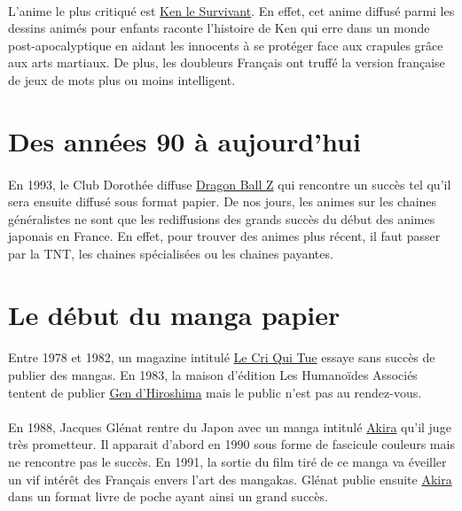 \paragraph{} L'anime le plus critiqué est \underline{Ken le Survivant}. En
effet, cet anime diffusé parmi les dessins animés pour enfants raconte
l'histoire de Ken qui erre dans un monde post-apocalyptique en aidant les
innocents à se protéger face aux crapules grâce aux arts martiaux. De plus, les
doubleurs Français ont truffé la version française de jeux de mots plus ou
moins intelligent.

\section{Des années 90 à aujourd'hui}

\paragraph{} En 1993, le Club Dorothée diffuse \underline{Dragon Ball Z} qui
rencontre un  succès tel qu'il sera ensuite diffusé sous format papier. De nos
jours, les animes sur les chaines généralistes ne sont que les rediffusions des
grands succès du début des animes japonais en France.  En effet, pour trouver
des animes plus récent, il faut passer par la TNT, les chaines spécialisées ou
les chaines payantes.

\section{Le début du manga papier}

\paragraph{} Entre 1978 et 1982, un magazine intitulé \underline{Le Cri Qui
Tue} essaye sans succès de publier des mangas. En 1983, la maison d'édition Les
Humanoïdes Associés tentent de publier \underline{Gen d'Hiroshima} mais le
public n'est pas au rendez-vous.

\paragraph{} En 1988, Jacques Glénat rentre du Japon avec un manga intitulé
\underline{Akira} qu'il juge très prometteur. Il apparait d'abord en 1990 sous
forme de fascicule couleurs mais ne rencontre pas le succès. En 1991, la sortie
du film tiré de ce manga va éveiller un vif intérêt des Français envers l'art
des mangakas. Glénat publie ensuite \underline{Akira} dans un format livre de
poche ayant ainsi un grand succès.

